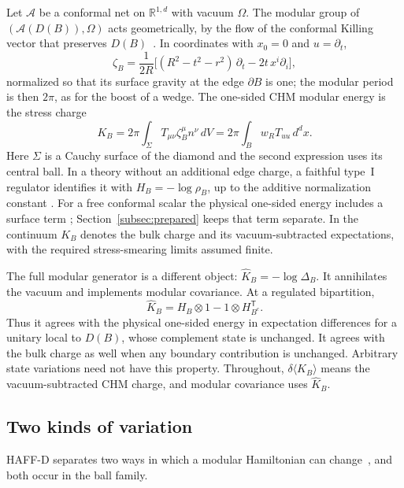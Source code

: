 \documentclass[12pt]{article}
\theoremstyle{definition}
\theoremstyle{remark}
\newcommand{\Khat}{\widehat K}
\newcommand{\ev}[1]{\langle #1\rangle}
\begin{document}
Let \(\mathcal A\) be a conformal net on \(\mathbb R^{1,d}\) with vacuum \(\Omega\). The
modular group of \((\mathcal A(D(B)),\Omega)\) acts geometrically, by the flow of the
conformal Killing vector that preserves \(D(B)\)~\cite{HislopLongo1982,BGL1993}. In
coordinates with \(x_0=0\) and \(u=\partial_t\),
\begin{equation}\label{eq:zeta}
\zeta_B=\frac1{2R}\Big[(R^2-t^2-r^2)\,\partial_t-2t\,x^i\partial_i\Big],
\end{equation}
normalized so that its surface gravity at the edge \(\partial B\) is one; the modular period
is then \(2\pi\), as for the boost of a wedge. The one-sided CHM modular energy is the stress charge
\begin{equation}\label{eq:chm}
K_B=2\pi\int_\Sigma T_{\mu\nu}\zeta_B^\mu n^\nu\,dV
=2\pi\int_B w_R T_{uu}\,d^dx .
\end{equation}
Here \(\Sigma\) is a Cauchy surface of the diamond and the second expression uses its
central ball. In a theory without an additional edge charge, a faithful type~I
regulator identifies it with \(H_B=-\log\rho_B\), up to the additive normalization
constant \cite{CasiniHuertaMyers2011}. For a free conformal scalar the physical
one-sided energy includes a surface term \cite{CasiniMazzitelliTeste2015};
Section~\ref{subsec:prepared} keeps that term separate. In the continuum \(K_B\)
denotes the bulk charge and its
vacuum-subtracted expectations, with the required stress-smearing limits assumed finite.

The full modular generator is a different object:
\(\Khat_B=-\log\Delta_B\). It annihilates the vacuum and implements modular covariance.
At a regulated bipartition,
\[
\Khat_B=H_B\otimes1-1\otimes H_{B^c}^{\mathsf T}.
\]
Thus it agrees with the physical one-sided energy in expectation differences for a
unitary local to \(D(B)\), whose complement state is unchanged. It agrees with the
bulk charge as well when any boundary contribution is unchanged. Arbitrary state variations need not
have this property. Throughout, \(\delta\ev{K_B}\) means the vacuum-subtracted CHM charge,
and modular covariance uses \(\Khat_B\).

\subsection{Two kinds of variation}\label{subsec:variations}

HAFF-D separates two ways in which a modular Hamiltonian can change~\cite{HAFFD}, and both
occur in the ball family.
\end{document}

